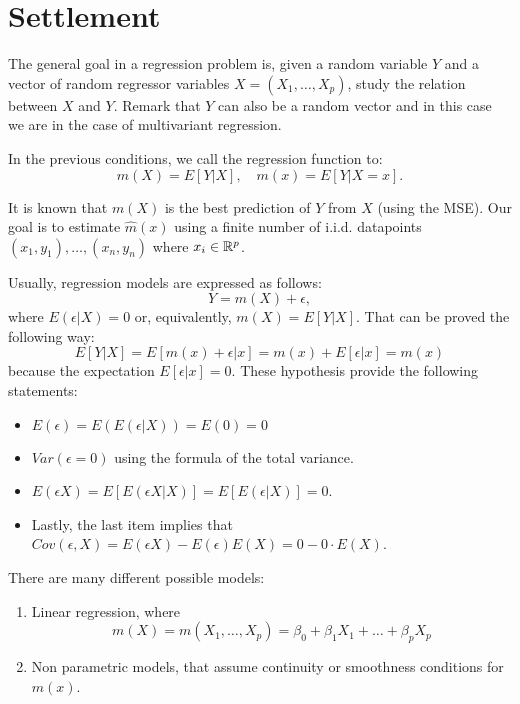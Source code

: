 

\section{Settlement}

The general goal in a regression problem is, given a random variable \(Y\) and a vector of random regressor variables \(X = \left(X_1,\dots,X_p\right)\), study the relation between \(X\) and \(Y\). Remark that \(Y\) can also be a random vector and in this case we are in the case of multivariant regression.

\begin{ndef}
In the previous conditions, we call the regression function to:
\[
m(X) = E\left[Y|X\right], \quad m(x) = E\left[Y|X = x\right].
\]
\end{ndef}

It is known that \(m(X)\) is the best prediction of \(Y\) from \(X\) (using the MSE). Our goal is to estimate \(\hat m(x)\) using a finite number of i.i.d. datapoints \((x_1,y_1),\dots,(x_n,y_n)\) where \(x_i \in \mathbb{R}^p\).

Usually, regression models are expressed as follows:
\[
Y = m(X) + \epsilon,
\]
where \(E(\epsilon | X) = 0\) or, equivalently, \(m(X) = E[Y|X]\). That can be proved the following way:
\[
E[Y|X] = E \left[ m(x) + \epsilon | x\right] = m(x) + E\left[ \epsilon | x\right] = m(x)
\]
because the expectation \(E \left[\epsilon | x\right] = 0\). These hypothesis provide the following statements:

\begin{itemize}
\item \(E(\epsilon) = E(E(\epsilon | X)) = E(0) = 0\)
\item \(Var(\epsilon = 0)\) using the formula of the total variance.
\item \(E(\epsilon X) = E\left[ E(\epsilon X | X)\right] = E\left[ E(\epsilon | X)\right] = 0\).
\item Lastly, the last item implies that \(Cov(\epsilon,X) = E(\epsilon X) - E(\epsilon)E(X) = 0 - 0\cdot E(X)\).
\end{itemize}

There are many different possible models:
\begin{enumerate}
\item Linear regression, where
\[
m(X) = m(X_1,\dots,X_p) = \beta_0 + \beta_1X_1 + \dots + \beta_p X_p
\]

\item Non parametric models, that assume continuity or smoothness conditions for \(m(x)\).
\end{enumerate}



